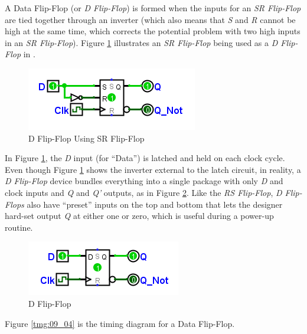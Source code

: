 A Data Flip-Flop (or \emph{D Flip-Flop}) is formed when the inputs for an \emph{SR Flip-Flop} are tied together through an inverter (which also means that \emph{S} and \emph{R} cannot be high at the same time, which corrects the potential problem with two high inputs in an \emph{SR Flip-Flop}). Figure \ref{fig:09_03} illustrates an \emph{SR Flip-Flop} being used as a \emph{D Flip-Flop} in \Le. 

\begin{figure}[H]
	\centering
	\includegraphics[width=\maxwidth{.95\linewidth}]{gfx/09_03}
	\caption{D Flip-Flop Using SR Flip-Flop}
	\label{fig:09_03}
\end{figure}

In Figure \ref{fig:09_03}, the \emph{D} input (for ``Data'') is latched and held on each clock cycle. Even though Figure \ref{fig:09_03} shows the inverter external to the latch circuit, in reality, a \emph{D Flip-Flop} device bundles everything into a single package with only \emph{D} and clock inputs and \emph{Q} and \emph{Q'} outputs, as in Figure \ref{fig:09_04}. Like the \emph{RS Flip-Flop}, \emph{D Flip-Flops} also have ``preset'' inputs on the top and bottom that lets the designer hard-set output \emph{Q} at either one or zero, which is useful during a power-up routine.

\begin{figure}[H]
	\centering
	\includegraphics[width=\maxwidth{.95\linewidth}]{gfx/09_04}
	\caption{D Flip-Flop}
	\label{fig:09_04}
\end{figure}

Figure \ref{tmg:09_04} is the timing diagram for a Data Flip-Flop.

